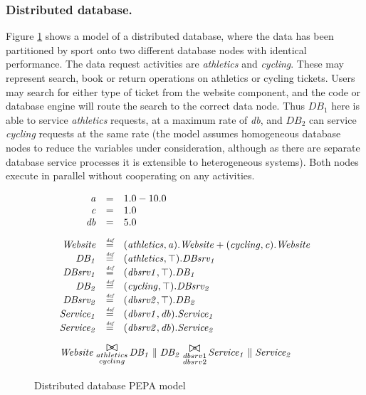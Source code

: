%
%
\FloatBarrier
\subsubsection{Distributed database.} Figure \ref{figure:pepa_ddnr_model} shows a model of a distributed database, where the data has been partitioned by sport onto two different database nodes with identical performance.  The data request activities are {\itshape athletics} and {\itshape cycling}.  These may represent search, book or return operations on athletics or cycling tickets.  Users may search for either type of ticket from the website component, and the code or database engine will route the search to the correct data node.  Thus $\mathit{DB_1}$ here is able to service {\itshape athletics} requests, at a maximum rate of {\itshape db}, and $\mathit{DB_2}$ can service {\itshape cycling} requests at the same rate (the model assumes homogeneous database nodes to reduce the variables under consideration, although as there are separate database service processes it is extensible to heterogeneous systems).  Both nodes execute in parallel without cooperating on any activities.

\begin{figure}
	\centering
	\begin{displaymath}
	\begin{array}{rcl}
	\mathit{a} & = & 1.0-10.0\\
	\mathit{c} & = & 1.0\\
	\mathit{db} & = & 5.0\\
	[2.0ex]		\mathit{Website} & \rmdef & (\mathit{athletics},\mathit{a}).\mathit{Website}+(\mathit{cycling},\mathit{c}).\mathit{Website}\\
	\mathit{DB_1} & \rmdef & (\mathit{athletics},\top).\mathit{DBsrv_1}\\
	\mathit{DBsrv_1} & \rmdef & (\mathit{dbsrv1},\top).\mathit{DB_1}\\
	\mathit{DB_2} & \rmdef & (\mathit{cycling},\top).\mathit{DBsrv_2}\\
	\mathit{DBsrv_2} & \rmdef & (\mathit{dbsrv2},\top).\mathit{DB_2}\\
	\mathit{Service_1} & \rmdef & (\mathit{dbsrv1},\mathit{db}).\mathit{Service_1}\\
	\mathit{Service_2} & \rmdef & (\mathit{dbsrv2},\mathit{db}).\mathit{Service_2}\\
	[2.0ex]		\multicolumn{3}{l}{\mathit{Website}\sync{\substack{athletics\\cycling}}\mathit{DB_1}\parallel\mathit{DB_2}\sync{\substack{dbsrv1\\dbsrv2}}\mathit{Service_1}\parallel\mathit{Service_2}}\\
	[2.0ex]	\end{array}
	\end{displaymath}
	\caption{Distributed database PEPA model}
	\label{figure:pepa_ddnr_model}
\end{figure}

